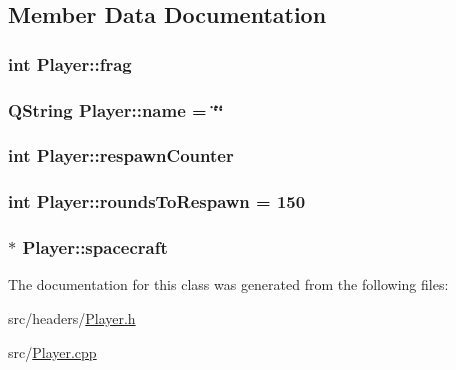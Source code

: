 \subsection{Member Data Documentation}
\hypertarget{class_player_a9528a6db252f2fe947fd7d9189837aec}{
\subsubsection[{frag}]{\setlength{\rightskip}{0pt plus 5cm}int Player\+::frag\hspace{0.3cm}{\ttfamily [protected]}}}\label{class_player_a9528a6db252f2fe947fd7d9189837aec}
\hypertarget{class_player_ac41b72814d9c41222dac999bc874280b}{
\subsubsection[{name}]{\setlength{\rightskip}{0pt plus 5cm}Q\+String Player\+::name = \char`\"{}\char`\"{}\hspace{0.3cm}{\ttfamily [protected]}}}\label{class_player_ac41b72814d9c41222dac999bc874280b}
\hypertarget{class_player_a942ba87d06e5be3a238229a0d152654c}{
\subsubsection[{respawn\+Counter}]{\setlength{\rightskip}{0pt plus 5cm}int Player\+::respawn\+Counter\hspace{0.3cm}{\ttfamily [protected]}}}\label{class_player_a942ba87d06e5be3a238229a0d152654c}
\hypertarget{class_player_a205c4499cffb2d684d5ff48dd1713d11}{
\subsubsection[{rounds\+To\+Respawn}]{\setlength{\rightskip}{0pt plus 5cm}int Player\+::rounds\+To\+Respawn = 150\hspace{0.3cm}{\ttfamily [protected]}}}\label{class_player_a205c4499cffb2d684d5ff48dd1713d11}
\hypertarget{class_player_a7cc88a054d2329b1ca7472a86b2030ca}{
\subsubsection[{spacecraft}]{$\ast$ Player\+::spacecraft\hspace{0.3cm}{\ttfamily [protected]}}}\label{class_player_a7cc88a054d2329b1ca7472a86b2030ca}


The documentation for this class was generated from the following files\+:\begin{DoxyCompactItemize}
\item 
src/headers/\hyperlink{_player_8h}{Player.\+h}\item 
src/\hyperlink{_player_8cpp}{Player.\+cpp}\end{DoxyCompactItemize}
